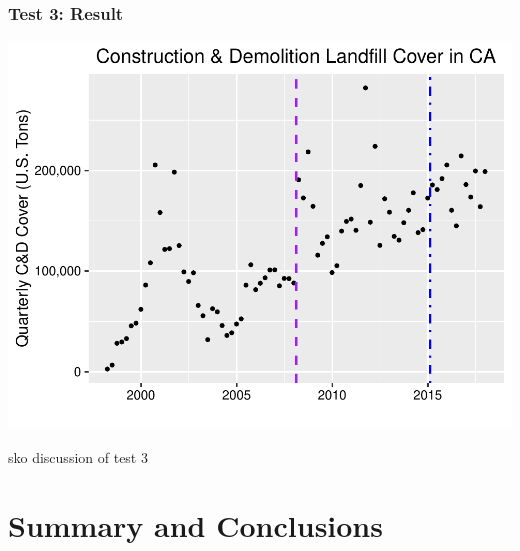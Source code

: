\documentclass[12pt,]{article}
\begin{document}
\subsubsection{Test 3: Result}\label{test-3-result}

\includegraphics{SKo_Project_Template_files/figure-latex/Test3_2-1.pdf}

sko discussion of test 3

\newpage

\section{Summary and Conclusions}\label{summary-and-conclusions}
\end{document}
